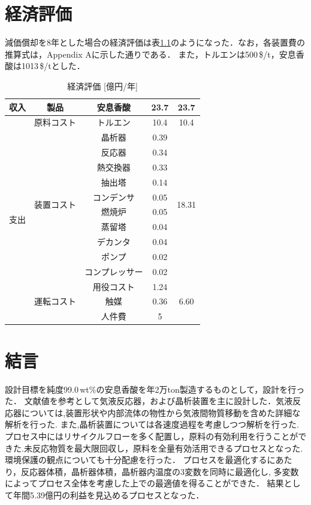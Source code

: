 \documentclass[a4j]{jsreport}
\begin{document}
\chapter{経済評価}
減価償却を8年とした場合の経済評価は表\ref{経済評価}のようになった．なお，各装置費の推算式は，Appendix Aに示した通りである．
また，トルエンは500\,\$/\si{\tonne}，安息香酸は1013\,\$/\si{\tonne}とした．
\begin{table}[htbp]
    \centering
    \caption{経済評価 [億円/年]}
    \label{経済評価}
    \begin{tabular}{c|c|cc|c}
      \hline
      収入 & 製品 & 安息香酸 & 23.7 & 23.7 \\
      \hline
      \multirow{14}{*}{支出} & 原料コスト & トルエン & 10.4 & 10.4 \\
      \cline{2-5}
      & \multirow{10}{*}{装置コスト} & 晶析器 & 0.39 & \multirow{10}{*}{18.31} \\
      & & 反応器 & 0.34 & \\
      & & 熱交換器 & 0.33 & \\
      & & 抽出塔 & 0.14 & \\
      & & コンデンサ & 0.05 & \\
      & & 燃焼炉 & 0.05 & \\
      & & 蒸留塔 & 0.04 & \\
      & & デカンタ & 0.04 & \\
      & & ポンプ & 0.02 & \\
      & & コンプレッサー & 0.02 & \\
      \cline{2-5}
      & \multirow{3}{*}{運転コスト} & 用役コスト & 1.24 & \multirow{3}{*}{6.60} \\
      & & 触媒 & 0.36 & \\
      & & 人件費 & 5 & \\
      \hline
    \end{tabular}
\end{table}


\clearpage
\chapter{結言}
設計目標を純度99.0\,wt\%の安息香酸を年2万ton製造するものとして，設計を行った．
文献値を参考として気液反応器，および晶析装置を主に設計した．気液反応器については,装置形状や内部流体の物性から気液間物質移動を含めた詳細な解析を行った.
また,晶析装置については各速度過程を考慮しつつ解析を行った.
プロセス中にはリサイクルフローを多く配置し，原料の有効利用を行うことができた.未反応物質を最大限回収し，原料を全量有効活用できるプロセスとなった.
環境保護の観点についても十分配慮を行った．
プロセスを最適化するにあたり，反応器体積，晶析器体積，晶析器内温度の3変数を同時に最適化し, 多変数によってプロセス全体を考慮した上での最適値を得ることができた．
結果として年間5.39億円の利益を見込めるプロセスとなった．
\end{document}
